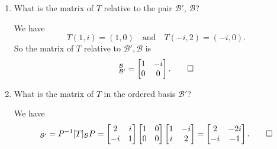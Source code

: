 \begin{enumerate}
\item What is the matrix of $T$ relative to the pair $\mathcal{B}'$,
  $\mathcal{B}$?
  \begin{solution}
    We have
    \begin{equation*}
      T(1,i) = (1,0) \quad\text{and}\quad
      T(-i, 2) = (-i,0).
    \end{equation*}
    So the matrix of $T$ relative to $\mathcal{B}',\mathcal{B}$ is
    \begin{equation*}
      [T]_{\mathcal{B}'}^{\mathcal{B}} =
      \begin{bmatrix}
        1 & -i \\
        0 & 0
      \end{bmatrix}. \qedhere
    \end{equation*}
  \end{solution}

\item What is the matrix of $T$ in the ordered basis $\mathcal{B}'$?
  \begin{solution}
    We have
    \begin{equation*}
      [T]_{\mathcal{B}'} = P^{-1}[T]_{\mathcal{B}}P =
      \begin{bmatrix}
        2 & i \\
        -i & 1
      \end{bmatrix}
      \begin{bmatrix}
        1 & 0 \\
        0 & 0
      \end{bmatrix}
      \begin{bmatrix}
        1 & -i \\
        i & 2
      \end{bmatrix} =
      \begin{bmatrix}
        2 & -2i \\
        -i & -1
      \end{bmatrix}. \qedhere
    \end{equation*}
  \end{solution}


\end{enumerate}
